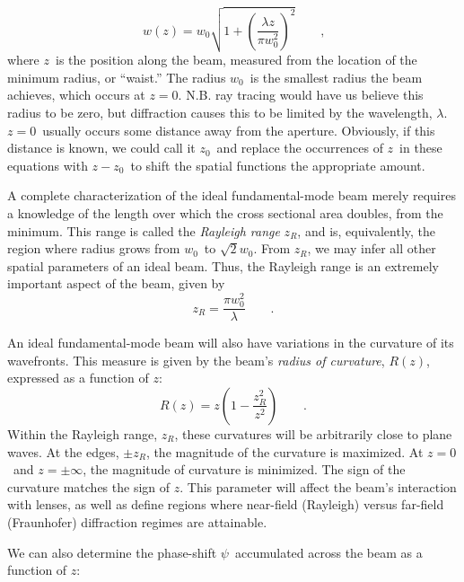\documentclass[a4paper,10pt]{report}
\numberwithin{equation}{section}
\begin{document}
{\begin{section}
\begin{equation}
 w(z) = w_0 \sqrt{ 1 + \left( \frac{\lambda z}{\pi w_0^2} \right)^2 } \qquad \text{,}
\end{equation}
where $z$\  is the position along the beam, measured from the location of the minimum radius, or ``waist.'' The radius $w_0$\  is the smallest radius the beam achieves, which occurs at $z=0$. N.B. ray tracing would have us believe this radius to be zero, but diffraction causes this to be limited by the wavelength, $\lambda$. $z=0$\  usually occurs some distance away from the aperture.\cite[p.11]{Marshall2004} Obviously, if this distance is known, we could call it $z_0$\  and replace the occurrences of $z$\  in these equations with $z-z_0$\  to shift the spatial functions the appropriate amount.
\par
A complete characterization of the ideal fundamental-mode beam merely requires a knowledge of the length over which the cross sectional area doubles, from the minimum. This range is called the \emph{Rayleigh range} $z_R$, and is, equivalently, the region where radius grows from $w_0$\  to $\sqrt{2}w_0$. From $z_R$, we may infer all other spatial parameters of an ideal beam. Thus, the Rayleigh range is an extremely important aspect of the beam, given by\cite[p.~562]{Hecht1987} 
\begin{equation}
 z_R = \frac{\pi w_0^2}{\lambda} \qquad \text{.}
\end{equation}
\par
An ideal fundamental-mode beam will also have variations in the curvature of its wavefronts. This measure is given by the beam's \emph{radius of curvature}, $R(z)$, expressed as a function of $z$:\cite[p.~12]{Marshall2004}
\begin{equation}
 R(z) = z \left(1 - \frac{z_R^2}{z^2} \right) \qquad \text{.}
\end{equation}
Within the Rayleigh range, $z_R$, these curvatures will be arbitrarily close to plane waves. At the edges, $\pm z_R$, the magnitude of the curvature is maximized. At $z=0$\  and $z=\pm \infty$, the magnitude of curvature is minimized. The sign of the curvature matches the sign of $z$. This parameter will affect the beam's interaction with lenses, as well as define regions where near-field (Rayleigh) versus far-field (Fraunhofer) diffraction regimes are attainable. 
\par
We can also determine the phase-shift $\psi$\  accumulated across the beam as a function of $z$:\cite[p.~12]{Marshall2004}
\begin{equation}

\end{equation}
\end{section}}
\end{document}
